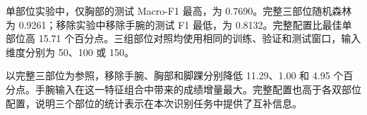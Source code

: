 单部位实验中，仅胸部的测试 Macro-F1 最高，为 0.7690。完整三部位随机森林为 0.9261；移除实验中移除手腕的测试 F1 最低，为 0.8132。完整配置比最佳单部位高 15.71 个百分点。三组部位对照均使用相同的训练、验证和测试窗口，输入维度分别为 50、100 或 150。

以完整三部位为参照，移除手腕、胸部和脚踝分别降低 11.29、1.00 和 4.95 个百分点。手腕输入在这一特征组合中带来的成绩增量最大。完整配置也高于各双部位配置，说明三个部位的统计表示在本次识别任务中提供了互补信息。
